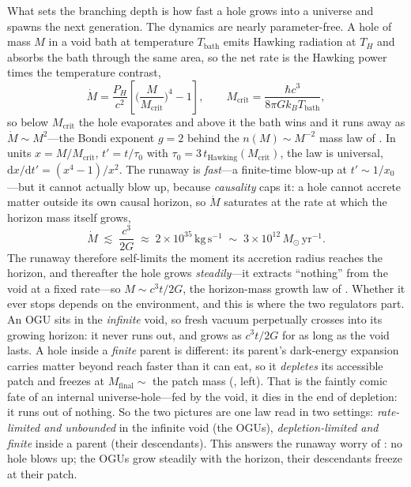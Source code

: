 What sets the branching depth is how fast a hole grows into a universe and spawns
the next generation. The dynamics are nearly parameter-free. A hole of mass $M$ in
a void bath at temperature $T_{\mathrm{bath}}$ emits Hawking radiation at $T_H$ and
absorbs the bath through the same area, so the net rate is the Hawking power times
the temperature contrast,
\begin{equation}
  \dot M = \frac{P_H}{c^2}\!\left[\Big(\frac{M}{M_{\mathrm{crit}}}\Big)^{4}-1\right],
  \qquad M_{\mathrm{crit}}=\frac{\hbar c^3}{8\pi G k_B T_{\mathrm{bath}}},
  \label{eq:growth}
\end{equation}
so below $M_{\mathrm{crit}}$ the hole evaporates and above it the bath wins and it
runs away as $\dot M\sim M^2$---the Bondi exponent $g=2$ behind the
$n(M)\sim M^{-2}$ mass law of . In units $x=M/M_{\mathrm{crit}}$,
$t'=t/\tau_0$ with $\tau_0=3\,t_{\mathrm{Hawking}}(M_{\mathrm{crit}})$, the law is
universal, $\mathrm{d}x/\mathrm{d}t'=(x^4-1)/x^2$. The runaway is \emph{fast}---a
finite-time blow-up at $t'\!\sim\!1/x_0$---but it cannot actually blow up, because
\emph{causality} caps it: a hole cannot accrete matter outside its own causal
horizon, so $\dot M$ saturates at the rate at which the horizon mass itself grows,
\begin{equation}
  \dot M \;\lesssim\; \frac{c^3}{2G} \;\approx\; 2\times10^{35}\,\mathrm{kg\,s^{-1}}
  \;\sim\; 3\times10^{12}\,M_\odot\,\mathrm{yr^{-1}}.
  \label{eq:causal-rate}
\end{equation}
The runaway therefore self-limits the moment its accretion radius reaches the
horizon, and thereafter the hole grows \emph{steadily}---it extracts ``nothing''
from the void at a fixed rate---so $M\sim c^3t/2G$, the horizon-mass growth law of
. Whether it ever stops depends on the environment, and
this is where the two regulators part. An OGU sits in the \emph{infinite} void, so
fresh vacuum perpetually crosses into its growing horizon: it never runs out, and
grows as $c^3t/2G$ for as long as the void lasts. A hole inside a \emph{finite}
parent is different: its parent's dark-energy expansion carries matter beyond
reach faster than it can eat, so it \emph{depletes} its accessible patch and
freezes at $M_{\mathrm{final}}\sim$ the patch mass (, left). That
is the faintly comic fate of an internal universe-hole---fed by the void, it dies
in the end of depletion: it runs out of nothing. So the two pictures are one law
read in two settings: \emph{rate-limited and unbounded} in the infinite void
(the OGUs), \emph{depletion-limited and finite} inside a parent (their descendants).
This answers the runaway worry of : no hole blows up; the OGUs grow
steadily with the horizon, their descendants freeze at their patch.


